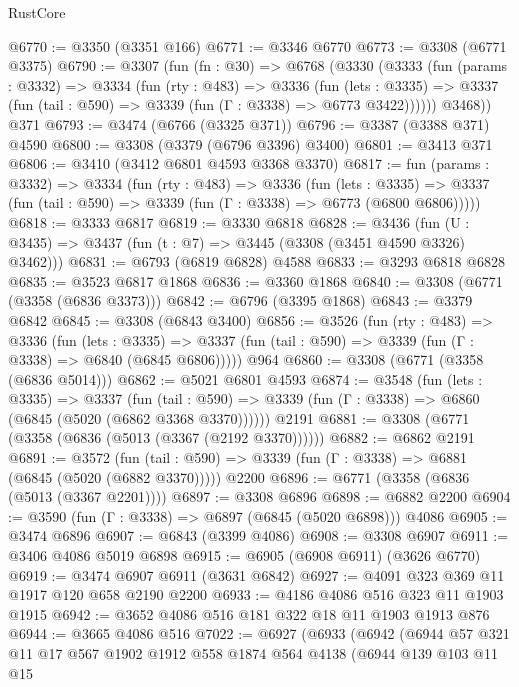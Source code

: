 \begin{lexlean}{RustCore}
\begin{coremodule}
@6770 := @3350 (@3351 @166)
@6771 := @3346 @6770
@6773 := @3308 (@6771 @3375)
@6790 := @3307
    (fun (fn : @30) =>
    @6768
      (@3330
        (@3333
          (fun (params : @3332) =>
          @3334
            (fun (rty : @483) =>
            @3336
              (fun (lets : @3335) =>
              @3337 (fun (tail : @590) => @3339 (fun (Γ : @3338) => @6773 @3422))))))
        @3468))
    @371
@6793 := @3474 (@6766 (@3325 @371))
@6796 := @3387 (@3388 @371) @4590
@6800 := @3308 (@3379 (@6796 @3396) @3400)
@6801 := @3413 @371
@6806 := @3410 (@3412 @6801 @4593 @3368 @3370)
@6817 := fun (params : @3332) =>
  @3334
    (fun (rty : @483) =>
    @3336
      (fun (lets : @3335) =>
      @3337 (fun (tail : @590) => @3339 (fun (Γ : @3338) => @6773 (@6800 @6806)))))
@6818 := @3333 @6817
@6819 := @3330 @6818
@6828 := @3436 (fun (U : @3435) => @3437 (fun (t : @7) => @3445 (@3308 (@3451 @4590 @3326) @3462)))
@6831 := @6793 (@6819 @6828) @4588
@6833 := @3293 @6818 @6828
@6835 := @3523 @6817 @1868
@6836 := @3360 @1868
@6840 := @3308 (@6771 (@3358 (@6836 @3373)))
@6842 := @6796 (@3395 @1868)
@6843 := @3379 @6842
@6845 := @3308 (@6843 @3400)
@6856 := @3526
    (fun (rty : @483) =>
    @3336
      (fun (lets : @3335) =>
      @3337 (fun (tail : @590) => @3339 (fun (Γ : @3338) => @6840 (@6845 @6806)))))
    @964
@6860 := @3308 (@6771 (@3358 (@6836 @5014)))
@6862 := @5021 @6801 @4593
@6874 := @3548
    (fun (lets : @3335) =>
    @3337
      (fun (tail : @590) => @3339 (fun (Γ : @3338) => @6860 (@6845 (@5020 (@6862 @3368 @3370))))))
    @2191
@6881 := @3308 (@6771 (@3358 (@6836 (@5013 (@3367 (@2192 @3370))))))
@6882 := @6862 @2191
@6891 := @3572
    (fun (tail : @590) => @3339 (fun (Γ : @3338) => @6881 (@6845 (@5020 (@6882 @3370)))))
    @2200
@6896 := @6771 (@3358 (@6836 (@5013 (@3367 @2201))))
@6897 := @3308 @6896
@6898 := @6882 @2200
@6904 := @3590 (fun (Γ : @3338) => @6897 (@6845 (@5020 @6898))) @4086
@6905 := @3474 @6896
@6907 := @6843 (@3399 @4086)
@6908 := @3308 @6907
@6911 := @3406 @4086 @5019 @6898
@6915 := @6905 (@6908 @6911) (@3626 @6770)
@6919 := @3474 @6907 @6911 (@3631 @6842)
@6927 := @4091 @323 @369 @11 @1917 @120 @658 @2190 @2200
@6933 := @4186 @4086 @516 @323 @11 @1903 @1915
@6942 := @3652 @4086 @516 @181 @322 @18 @11 @1903 @1913 @876
@6944 := @3665 @4086 @516
@7022 := @6927
    (@6933
      (@6942
        (@6944
          @57
          @321
          @11
          @17
          @567
          @1902
          @1912
          @558
          @1874
          @564
          @4138
          (@6944
            @139
            @103
            @11
            @15

\end{coremodule}
\end{lexlean}
